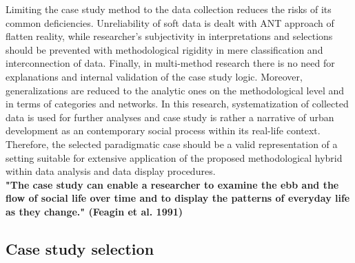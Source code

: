 \documentclass[11pt]{report}
\begin{document}
Limiting the case study method to the data collection reduces the risks of its common deficiencies. Unreliability of soft data is dealt with ANT approach of flatten reality, while researcher's subjectivity in interpretations and selections should be prevented with methodological rigidity in mere classification and interconnection of data. Finally, in multi-method research there is no need for explanations and internal validation of the case study logic. Moreover, generalizations are reduced to the analytic ones on the methodological level and in terms of categories and networks. In this research, systematization of collected data is used for further analyses and case study is rather a narrative of urban development as an contemporary social process within its real-life context. Therefore, the selected paradigmatic case should be a valid representation of a setting suitable for extensive application of the proposed methodological hybrid within data analysis and data display procedures.
\\

\textbf{"The case study can enable a researcher to examine the ebb and the flow of social life over time and to display the patterns of everyday life as they change." (Feagin et al. 1991)}

\subsection{Case study selection}
\end{document}
